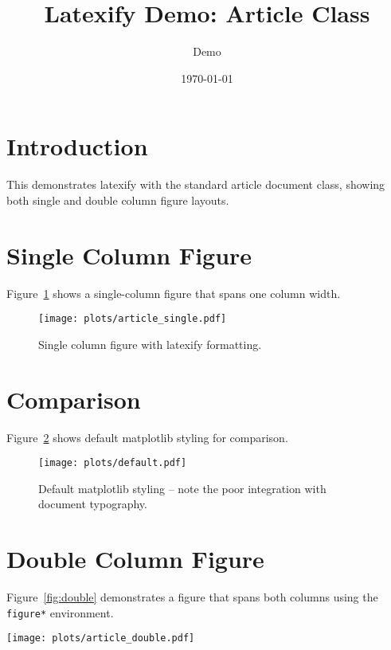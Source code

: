 \documentclass[twocolumn]{article}
\title{Latexify Demo: Article Class}
\author{Demo}
\date{\today}
\begin{document}
\maketitle

\section{Introduction}

This demonstrates latexify with the standard article document class, showing both single and double column figure layouts.

\section{Single Column Figure}

Figure~\ref{fig:single} shows a single-column figure that spans one column width.

\begin{figure}[htbp]
    \centering
    \texttt{[image: plots/article\_single.pdf]}
    \caption{Single column figure with latexify formatting.}
    \label{fig:single}
\end{figure}

\section{Comparison}

Figure~\ref{fig:default} shows default matplotlib styling for comparison.

\begin{figure}[htbp]
    \centering
    \texttt{[image: plots/default.pdf]}
    \caption{Default matplotlib styling -- note the poor integration with document typography.}
    \label{fig:default}
\end{figure}

\section{Double Column Figure}

Figure~\ref{fig:double} demonstrates a figure that spans both columns using the \texttt{figure*} environment.

\begin{figure*}[htbp]
    \centering
    \texttt{[image: plots/article\_double.pdf]}
    \caption{Double column figure spanning full page width with latexify formatting.}
    \label{fig:double}
\end{figure*}
\end{document}
